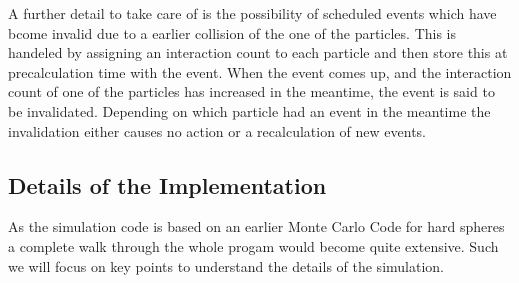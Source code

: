 A further detail to take care of is the possibility of scheduled events which have bcome invalid due to a earlier collision of the one of the particles. This is handeled by assigning an interaction count to each particle and then store this at precalculation time with the event. When the event comes up, and the interaction count of one of the particles has increased in the meantime, the event is said to be invalidated. Depending on which particle had an event in the meantime the invalidation either causes no action or a recalculation of new events.\\  

\subsection{Details of the Implementation} 
\label{sec:implemetation}
As the simulation code is based on an earlier Monte Carlo Code for hard spheres a complete walk through the whole progam would become quite extensive. Such we will focus on key points to understand the details of the simulation.\\


